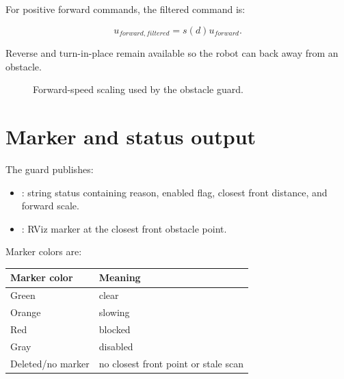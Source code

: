 For positive forward commands, the filtered command is:

\begin{equation}
u_{forward,filtered}=s(d)u_{forward}.
\end{equation}

Reverse and turn-in-place remain available so the robot can back away from an obstacle.

\begin{figure}[htbp]
\centering
{}
\caption{Forward-speed scaling used by the obstacle guard.}
\end{figure}

\section{Marker and status output}

The guard publishes:

\begin{itemize}
  \item {}: string status containing reason, enabled flag, closest front distance, and forward scale.
  \item {}: RViz marker at the closest front obstacle point.
\end{itemize}

Marker colors are:

\begin{center}
\begin{tabular}{ll}
\toprule
Marker color & Meaning\\
\midrule
Green & clear\\
Orange & slowing\\
Red & blocked\\
Gray & disabled\\
Deleted/no marker & no closest front point or stale scan\\
\bottomrule
\end{tabular}
\end{center}

